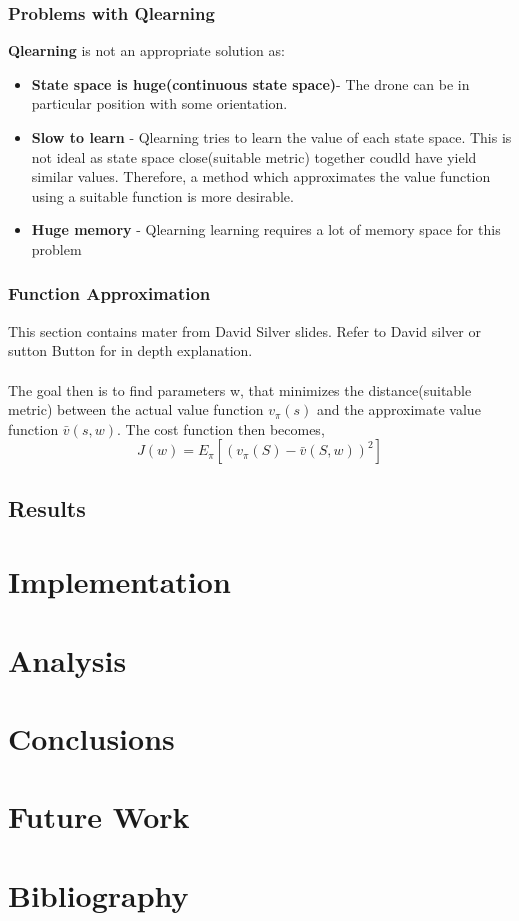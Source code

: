 \documentclass[10pt]{article}
\begin{document}
\subsubsection{Problems with Qlearning}
\textbf{Qlearning} is not an appropriate solution as:
\begin{itemize}
  \item \textbf{State space is huge(continuous state space)}- The drone can be in particular position with some orientation. 
  \item \textbf{Slow to learn} - Qlearning tries to learn the value of each state space. This is not ideal as state space
        close(suitable metric) together coudld have yield similar values. Therefore, a method which approximates the value function
        using a suitable function is more desirable.
  \item \textbf{Huge memory} - Qlearning learning requires a lot of memory space for this problem
\end{itemize}
\subsubsection{Function Approximation}
This section contains mater from David Silver slides. Refer to David silver or sutton Button for in depth explanation. \\ \\

The goal then is to find parameters w, that minimizes the distance(suitable metric) between the actual value function $v_\pi(s)$ and 
the approximate value function $\bar{v}(s,w)$.
The cost function then becomes,
\begin{equation}
    J(w) =  E_\pi[(v_\pi(S) - \bar{v}(S,w))^2]
\end{equation}


\subsection{Results}
\section{Implementation}
\section{Analysis}
\section{Conclusions}
\section{Future Work}
\section{Bibliography}
\end{document}
